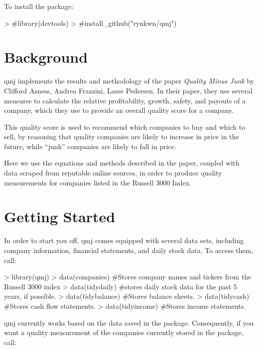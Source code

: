 \documentclass[12pt]{article}
\begin{document}


To install the package:

\begin{Schunk}
\begin{Sinput}
> #library(devtools)
> #install_github("rynkwn/qmj")
\end{Sinput}
\end{Schunk}

\section*{Background}
qmj implements the results and methodology of the paper \emph{Quality Minus Junk} by Clifford Asness, Andrea Frazzini, Lasse Pedersen. In their paper, they use several measures to calculate the relative profitability, growth, safety, and payouts of a company, which they use to provide an overall quality score for a company.

This quality score is used to recommend which companies to buy and which to sell, by reasoning that quality companies are likely to increase in price in the future, while ``junk'' companies are likely to fall in price.

Here we use the equations and methods described in the paper, coupled with data scraped from reputable online sources, in order to produce quality measurements for companies listed in the Russell 3000 Index.

\section*{Getting Started}
In order to start you off, qmj comes equipped with several data sets, including company information, financial statements, and daily stock data. To access them, call:

\begin{Schunk}
\begin{Sinput}
> library(qmj)
> data(companies) #Stores company names and tickers from the Russell 3000 index
> data(tidydaily)  #stores daily stock data for the past 5 years, if possible.
> data(tidybalance) #Stores balance sheets.
> data(tidycash) #Stores cash flow statements.
> data(tidyincome) #Stores income statements.
\end{Sinput}
\end{Schunk}

qmj currently works based on the data saved in the package. Consequently, if you want a quality measurement of the companies currently stored in the package, call:
\end{document}
